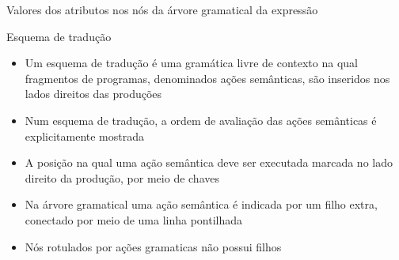 \begin{frame}[fragile]{Valores dos atributos nos nós da árvore gramatical da expressão }

    \begin{figure}
        \centering

    \end{figure}

\end{frame}

\begin{frame}[fragile]{Esquema de tradução}

    \begin{itemize}
        \item Um esquema de tradução é uma gramática livre de contexto na qual fragmentos de programas, denominados ações semânticas, são inseridos nos lados
            direitos das produções
        \pause

        \item Num esquema de tradução, a ordem de avaliação das ações semânticas é explicitamente mostrada
        \pause

        \item A posição na qual uma ação semântica deve ser executada marcada no lado direito da produção, por meio de chaves
        \pause

        \item Na árvore gramatical uma ação semântica é indicada por um filho extra, conectado por meio de uma linha pontilhada
        \pause

        \item Nós rotulados por ações gramaticas não possui filhos
    \end{itemize}

\end{frame}

